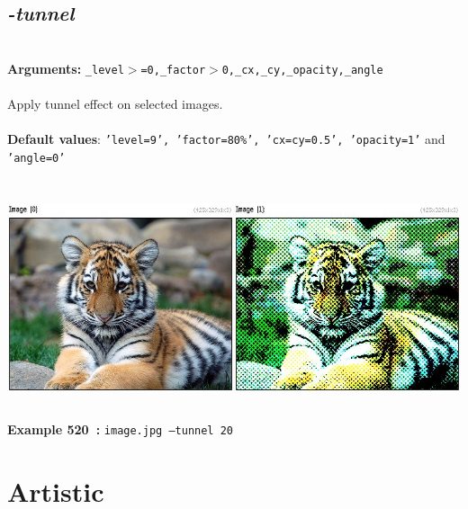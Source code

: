 \documentclass[a4paper,11pt,twoside]{book}
\begin{document}
\subsection{\emph{-tunnel} }\vspace*{-0.5em}
~\\\textbf{Arguments: } 
{\small \texttt{\_level$>$=0,\_factor$>$0,\_cx,\_cy,\_opacity,\_angle}}\\~\\
Apply tunnel effect on selected images.
~\\~\\\textbf{Default values}: {\small \texttt{'level=9', 'factor=80\%', 'cx=cy=0.5', 'opacity=1'} and \texttt{'angle=0'}}
\begin{center}\includegraphics[keepaspectratio=true,height=7cm,width=\textwidth]{img/gmic_def520.jpg}\\
{\footnotesize \textbf{Example 520~:} \texttt{image.jpg --tunnel 20}}
\end{center}
\section{Artistic}
\end{document}
